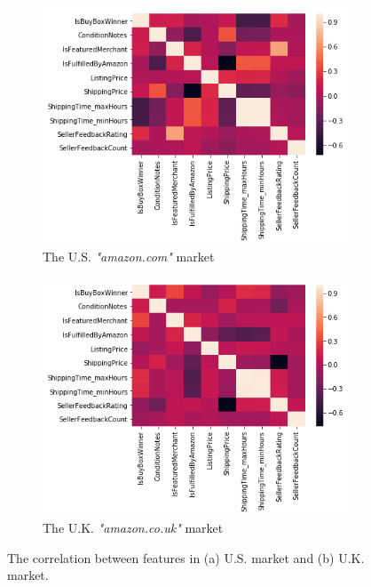 \begin{figure}
	\begin{subfigure}{0.45\textwidth}
		\includegraphics[width=\linewidth]{fig_market_US_corr.png}
		\caption{The U.S. \textit{"amazon.com"} market } \label{fig:corrus}
	\end{subfigure}
	\begin{subfigure}{0.45\textwidth}
		\includegraphics[width=\linewidth]{fig_market_UK_corr.png}
		\caption{The U.K. \textit{"amazon.co.uk"} market} \label{fig:corrfr}
	\end{subfigure}
	\caption{The correlation between features in (a) U.S. market and (b) U.K. market.} \label{fig:corr}
\end{figure}

